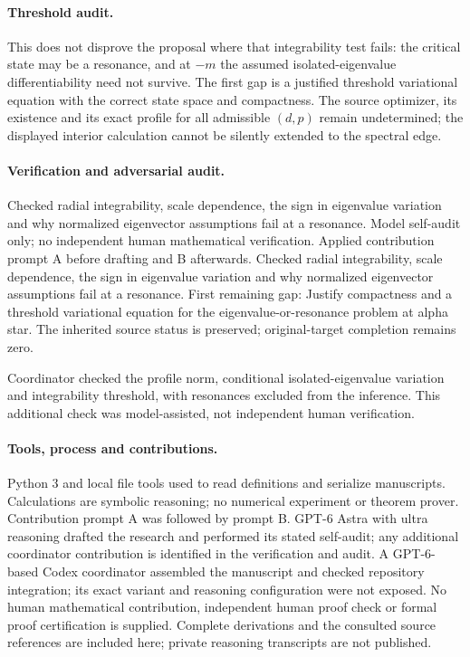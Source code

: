 \documentclass[11pt]{article}
\begin{document}
\paragraph{Threshold audit.} This does not disprove the proposal where that integrability test fails: the critical state may be a resonance, and at \(-m\) the assumed isolated-eigenvalue differentiability need not survive. The first gap is a justified threshold variational equation with the correct state space and compactness. The source optimizer, its existence and its exact profile for all admissible \((d,p)\) remain undetermined; the displayed interior calculation cannot be silently extended to the spectral edge.

\paragraph{Verification and adversarial audit.}
Checked radial integrability, scale dependence, the sign in eigenvalue variation and why normalized eigenvector assumptions fail at a resonance. Model self-audit only; no independent human mathematical verification. Applied contribution prompt A before drafting and B afterwards. Checked radial integrability, scale dependence, the sign in eigenvalue variation and why normalized eigenvector assumptions fail at a resonance. First remaining gap: Justify compactness and a threshold variational equation for the eigenvalue-or-resonance problem at alpha star. The inherited source status is preserved; original-target completion remains zero.

Coordinator checked the profile norm, conditional isolated-eigenvalue variation and integrability threshold, with resonances excluded from the inference. This additional check was model-assisted, not independent human verification.

\paragraph{Tools, process and contributions.}
Python 3 and local file tools used to read definitions and serialize manuscripts. Calculations are symbolic reasoning; no numerical experiment or theorem prover. Contribution prompt A was followed by prompt B. GPT-6 Astra with ultra reasoning drafted the research and performed its stated self-audit; any additional coordinator contribution is identified in the verification and audit. A GPT-6-based Codex coordinator assembled the manuscript and checked repository integration; its exact variant and reasoning configuration were not exposed. No human mathematical contribution, independent human proof check or formal proof certification is supplied. Complete derivations and the consulted source references are included here; private reasoning transcripts are not published.
\end{document}
